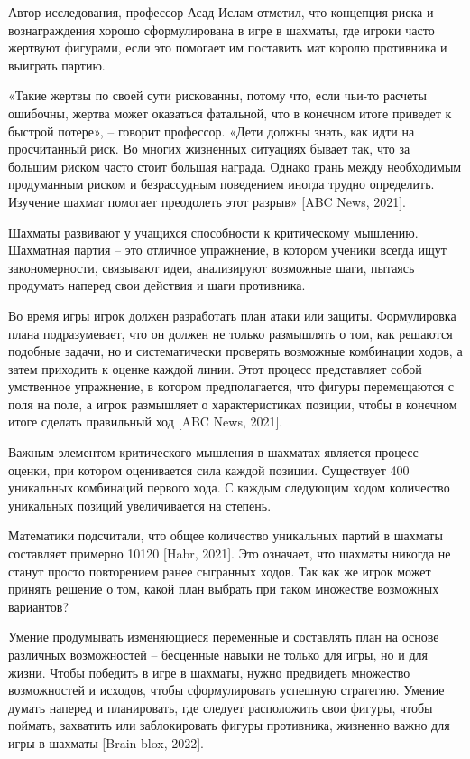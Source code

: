 Автор исследования, профессор Асад Ислам отметил, что концепция риска и вознаграждения хорошо сформулирована в игре в шахматы, где игроки часто жертвуют фигурами, если это помогает им поставить мат королю противника и выиграть партию.

«Такие жертвы по своей сути рискованны, потому что, если чьи-то расчеты ошибочны, жертва может оказаться фатальной, что в конечном итоге приведет к быстрой потере», – говорит профессор. «Дети должны знать, как идти на просчитанный риск. Во многих жизненных ситуациях бывает так, что за большим риском часто стоит большая награда. Однако грань между необходимым продуманным риском и безрассудным поведением иногда трудно определить. Изучение шахмат помогает преодолеть этот разрыв» [ABC News, 2021].

Шахматы развивают у учащихся способности к критическому мышлению. Шахматная партия – это отличное упражнение, в котором ученики всегда ищут закономерности, связывают идеи, анализируют возможные шаги, пытаясь продумать наперед свои действия и шаги противника.

Во время игры игрок должен разработать план атаки или защиты. Формулировка плана подразумевает, что он должен не только размышлять о том, как решаются подобные задачи, но и систематически проверять возможные комбинации ходов, а затем приходить к оценке каждой линии. Этот процесс представляет собой умственное упражнение, в котором предполагается, что фигуры перемещаются с поля на поле, а игрок размышляет о характеристиках позиции, чтобы в конечном итоге сделать правильный ход [ABC News, 2021].

Важным элементом критического мышления в шахматах является процесс оценки, при котором оценивается сила каждой позиции. Существует 400 уникальных комбинаций первого хода. С каждым следующим ходом количество уникальных позиций увеличивается на степень.

Математики подсчитали, что общее количество уникальных партий в шахматы составляет примерно 10120 [Habr, 2021]. Это означает, что шахматы никогда не станут просто повторением ранее сыгранных ходов. Так как же игрок может принять решение о том, какой план выбрать при таком множестве возможных вариантов?

Умение продумывать изменяющиеся переменные и составлять план на основе различных возможностей – бесценные навыки не только для игры, но и для жизни. Чтобы победить в игре в шахматы, нужно предвидеть множество возможностей и исходов, чтобы сформулировать успешную стратегию. Умение думать наперед и планировать, где следует расположить свои фигуры, чтобы поймать, захватить или заблокировать фигуры противника, жизненно важно для игры в шахматы [Brain blox, 2022].

